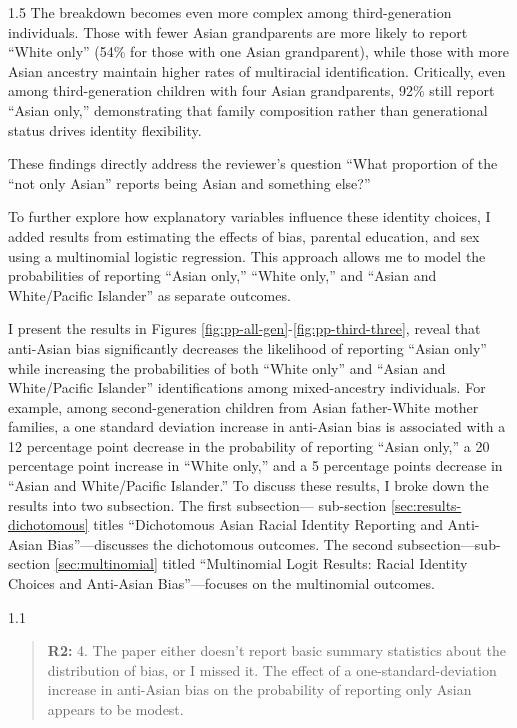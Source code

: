 \documentclass[12pt,english]{article}
\newcommand{\rrquote}{1.1}
\newcommand{\rrxspc}{1.5}
\begin{document}
\begin{refsection}
\begin{spacing}{\rrxspc}
            The breakdown becomes even more complex among third-generation individuals. Those with fewer Asian grandparents are more likely to report ``White only'' (54\% for those with one Asian grandparent), while those with more Asian ancestry maintain higher rates of multiracial identification. Critically, even among third-generation children with four Asian grandparents, 92\% still report ``Asian only,'' demonstrating that family composition rather than generational status drives identity flexibility.

            These findings directly address the reviewer's question ``What proportion of the “not only Asian” reports being Asian and something else?'' 

            To further explore how explanatory variables influence these identity choices, I added results from estimating the effects of bias, parental education, and sex using a multinomial logistic regression. This approach allows me to model the probabilities of reporting ``Asian only,'' ``White only,'' and ``Asian and White/Pacific Islander'' as separate outcomes.

            I present the results in Figures \ref{fig:pp-all-gen}-\ref{fig:pp-third-three}, reveal that anti-Asian bias significantly decreases the likelihood of reporting ``Asian only'' while increasing the probabilities of both ``White only'' and ``Asian and White/Pacific Islander'' identifications among mixed-ancestry individuals. For example, among second-generation children from Asian father-White mother families, a one standard deviation increase in anti-Asian bias is associated with a 12 percentage point decrease in the probability of reporting ``Asian only,'' a 20 percentage point increase in ``White only,'' and a 5 percentage points decrease in ``Asian and White/Pacific Islander.'' To discuss these results, I broke down the results into two subsection. The first subsection--- sub-section \ref{sec:results-dichotomous} titles ``Dichotomous Asian Racial Identity Reporting and Anti-Asian Bias''---discusses the dichotomous outcomes. The second subsection---sub-section \ref{sec:multinomial} titled ``Multinomial Logit Results: Racial Identity Choices and Anti-Asian Bias''---focuses on the multinomial outcomes.

    \end{spacing}

    \begin{spacing}{\rrquote}
        \begin{quotation}
        \textbf{R2: } 4. The paper either doesn’t report basic summary statistics about the distribution of bias, or I missed it. The effect of a one-standard-deviation increase in anti-Asian bias on the probability of reporting only Asian appears to be modest.
        \end{quotation}
        \end{spacing}
        

\end{refsection}
\end{document}
